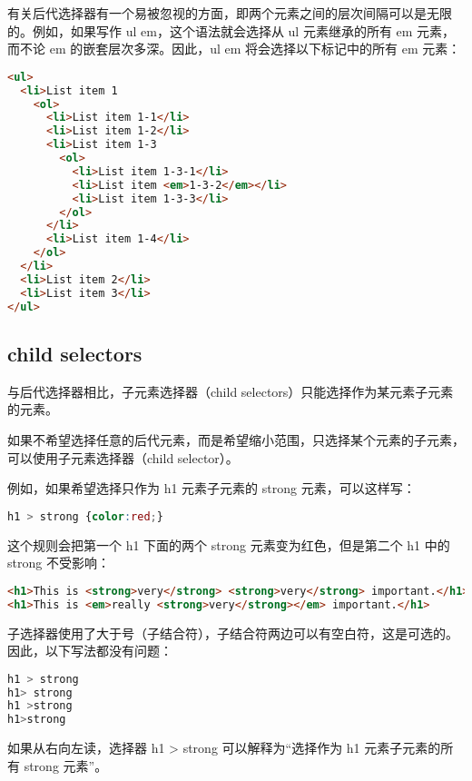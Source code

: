 有关后代选择器有一个易被忽视的方面，即两个元素之间的层次间隔可以是无限的。例如，如果写作 ul em，这个语法就会选择从 ul 元素继承的所有 em 元素，而不论 em 的嵌套层次多深。因此，ul em 将会选择以下标记中的所有 em 元素：





\begin{lstlisting}[language=HTML]
<ul>
  <li>List item 1
    <ol>
      <li>List item 1-1</li>
      <li>List item 1-2</li>
      <li>List item 1-3
        <ol>
          <li>List item 1-3-1</li>
          <li>List item <em>1-3-2</em></li>
          <li>List item 1-3-3</li>
        </ol>
      </li>
      <li>List item 1-4</li>
    </ol>
  </li>
  <li>List item 2</li>
  <li>List item 3</li>
</ul>
\end{lstlisting}


\subsection{child selectors}



与后代选择器相比，子元素选择器（child selectors）只能选择作为某元素子元素的元素。



如果不希望选择任意的后代元素，而是希望缩小范围，只选择某个元素的子元素，可以使用子元素选择器（child selector）。

例如，如果希望选择只作为 h1 元素子元素的 strong 元素，可以这样写：


\begin{lstlisting}[language=CSS]
h1 > strong {color:red;}
\end{lstlisting}

这个规则会把第一个 h1 下面的两个 strong 元素变为红色，但是第二个 h1 中的 strong 不受影响：


\begin{lstlisting}[language=HTML]
<h1>This is <strong>very</strong> <strong>very</strong> important.</h1>
<h1>This is <em>really <strong>very</strong></em> important.</h1>
\end{lstlisting}


子选择器使用了大于号（子结合符），子结合符两边可以有空白符，这是可选的。因此，以下写法都没有问题：


\begin{lstlisting}[language=CSS]
h1 > strong
h1> strong
h1 >strong
h1>strong
\end{lstlisting}

如果从右向左读，选择器 h1 > strong 可以解释为“选择作为 h1 元素子元素的所有 strong 元素”。

